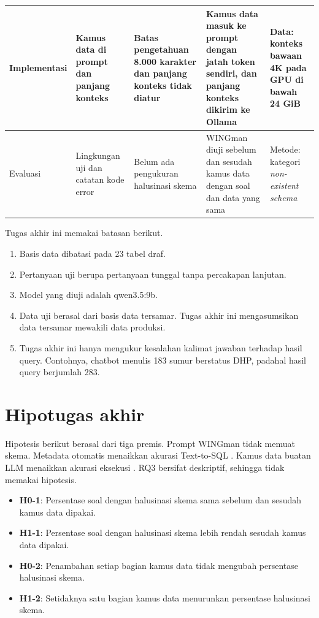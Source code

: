 \begin{table}[!htbp]
\begin{tabularx}{\textwidth}{|>{\raggedright\arraybackslash}p{2.0cm}|>{\raggedright\arraybackslash}p{2.0cm}|>{\raggedright\arraybackslash}X|>{\raggedright\arraybackslash}X|>{\raggedright\arraybackslash\footnotesize}p{2.8cm}|}
    \hline
    Implementasi & Kamus data di prompt dan panjang konteks & Batas pengetahuan 8.000 karakter dan panjang konteks tidak diatur & Kamus data masuk ke prompt dengan jatah token sendiri, dan panjang konteks dikirim ke Ollama & Data: konteks bawaan 4K pada GPU di bawah 24 GiB \autocite{ollamacontextlength} \\
    \hline
    Evaluasi & Lingkungan uji dan catatan kode error & Belum ada pengukuran halusinasi skema & WINGman diuji sebelum dan sesudah kamus data dengan soal dan data yang sama & Metode: kategori \emph{non-existent schema} \autocite{shen2026understanding} \\
    \hline
  \end{tabularx}
\end{table}

Tugas akhir ini memakai batasan berikut.

\begin{enumerate}
\item	Basis data dibatasi pada 23 tabel draf.
\item	Pertanyaan uji berupa pertanyaan tunggal tanpa percakapan lanjutan.
\item	Model yang diuji adalah qwen3.5:9b.
\item	Data uji berasal dari basis data tersamar. Tugas akhir ini mengasumsikan data tersamar mewakili data produksi.
\item	Tugas akhir ini hanya mengukur kesalahan kalimat jawaban terhadap hasil query. Contohnya, chatbot menulis 183 sumur berstatus DHP, padahal hasil query berjumlah 283.
\end{enumerate}

\section{Hipotugas akhir}
Hipotesis berikut berasal dari tiga premis. Prompt WINGman tidak memuat skema. Metadata otomatis menaikkan akurasi Text-to-SQL \autocite{shkapenyuk2025automaticmetadataextractiontexttosql}. Kamus data buatan LLM menaikkan akurasi eksekusi \autocite{giancotti2026dataatlas}. RQ3 bersifat deskriptif, sehingga tidak memakai hipotesis.

\begin{itemize}
\item	\textbf{H0-1}: Persentase soal dengan halusinasi skema sama sebelum dan sesudah kamus data dipakai.
\item	\textbf{H1-1}: Persentase soal dengan halusinasi skema lebih rendah sesudah kamus data dipakai.
\item	\textbf{H0-2}: Penambahan setiap bagian kamus data tidak mengubah persentase halusinasi skema.
\item	\textbf{H1-2}: Setidaknya satu bagian kamus data menurunkan persentase halusinasi skema.
\end{itemize}

